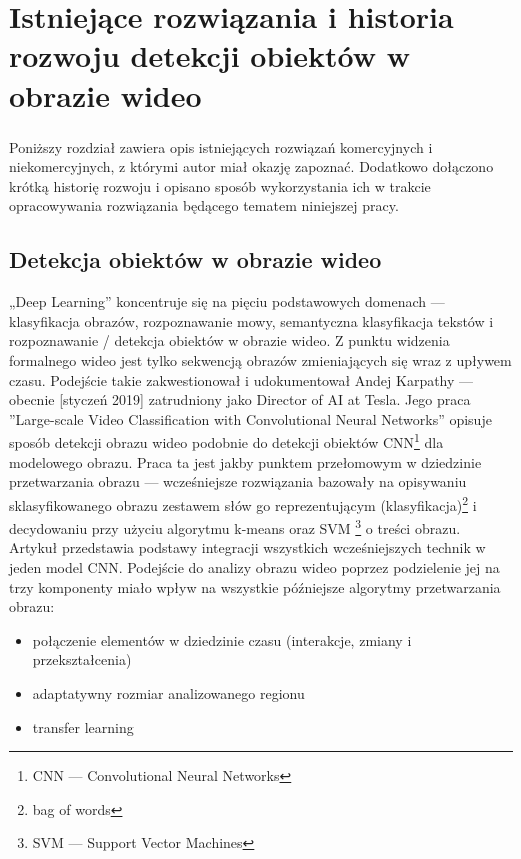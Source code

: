 \chapter{Istniejące rozwiązania i historia rozwoju detekcji obiektów w obrazie wideo} \label{ch:historia}
\subsection*{} \noindent Poniższy rozdział zawiera opis istniejących rozwiązań komercyjnych i niekomercyjnych, z którymi autor miał okazję zapoznać. Dodatkowo dołączono krótką historię rozwoju i opisano sposób wykorzystania ich w trakcie opracowywania rozwiązania będącego tematem niniejszej pracy.

\section{Detekcja obiektów w obrazie wideo}
„Deep Learning” koncentruje się na pięciu podstawowych domenach --- klasyfikacja obrazów, rozpoznawanie mowy, semantyczna klasyfikacja tekstów i rozpoznawanie / detekcja obiektów w obrazie wideo. Z punktu widzenia formalnego wideo jest tylko sekwencją obrazów zmieniających się wraz z upływem czasu. Podejście takie zakwestionował i udokumentował Andej Karpathy --- obecnie [styczeń 2019] zatrudniony jako Director of AI at Tesla.
Jego praca ''Large-scale Video Classification with Convolutional Neural Networks''\cite{KarpathyCVPR14} opisuje sposób detekcji obrazu wideo podobnie do detekcji obiektów CNN\footnote{CNN --- Convolutional Neural Networks} dla modelowego obrazu. Praca ta jest jakby punktem przełomowym w dziedzinie przetwarzania obrazu --- wcześniejsze rozwiązania bazowały na opisywaniu sklasyfikowanego obrazu zestawem słów go reprezentującym (klasyfikacja)\footnote{bag of words} i decydowaniu przy użyciu algorytmu k-means %
oraz SVM %
\footnote{SVM --- Support Vector Machines} o treści obrazu. Artykuł przedstawia podstawy integracji wszystkich wcześniejszych technik w jeden model CNN. Podejście do analizy obrazu wideo poprzez podzielenie jej na trzy komponenty miało wpływ na wszystkie późniejsze algorytmy przetwarzania obrazu:
\begin{itemize}
    \item połączenie elementów w dziedzinie czasu (interakcje, zmiany i przekształcenia)
    \item adaptatywny rozmiar analizowanego regionu
    \item transfer learning
\end{itemize}

